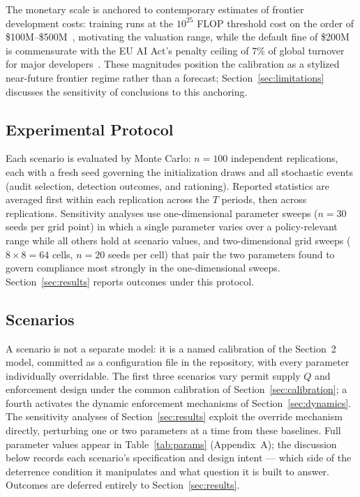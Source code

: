 The monetary scale is anchored to contemporary estimates of frontier development costs: training runs at the $10^{25}$ FLOP threshold cost on the order of \$100M--\$500M~\citep{heim2024compute}, motivating the valuation range, while the default fine of \$200M is commensurate with the EU AI Act's penalty ceiling of 7\% of global turnover for major developers~\citep{eu_ai_act_2024}. These magnitudes position the calibration as a stylized near-future frontier regime rather than a forecast; Section~\ref{sec:limitations} discusses the sensitivity of conclusions to this anchoring.

\subsection{Experimental Protocol}
\label{sec:protocol}

Each scenario is evaluated by Monte Carlo: $n = 100$ independent replications, each with a fresh seed governing the initialization draws and all stochastic events (audit selection, detection outcomes, and rationing). Reported statistics are averaged first within each replication across the $T$ periods, then across replications. Sensitivity analyses use one-dimensional parameter sweeps ($n = 30$ seeds per grid point) in which a single parameter varies over a policy-relevant range while all others hold at scenario values, and two-dimensional grid sweeps ($8 \times 8 = 64$ cells, $n = 20$ seeds per cell) that pair the two parameters found to govern compliance most strongly in the one-dimensional sweeps. Section~\ref{sec:results} reports outcomes under this protocol.

\subsection{Scenarios}
\label{sec:scenarios}

A scenario is not a separate model: it is a named calibration of the Section~2 model, committed as a configuration file in the repository, with every parameter individually overridable. The first three scenarios vary permit supply $Q$ and enforcement design under the common calibration of Section~\ref{sec:calibration}; a fourth activates the dynamic enforcement mechanisms of Section~\ref{sec:dynamics}. The sensitivity analyses of Section~\ref{sec:results} exploit the override mechanism directly, perturbing one or two parameters at a time from these baselines. Full parameter values appear in Table~\ref{tab:params} (Appendix~A); the discussion below records each scenario's specification and design intent --- which side of the deterrence condition it manipulates and what question it is built to answer. Outcomes are deferred entirely to Section~\ref{sec:results}.

